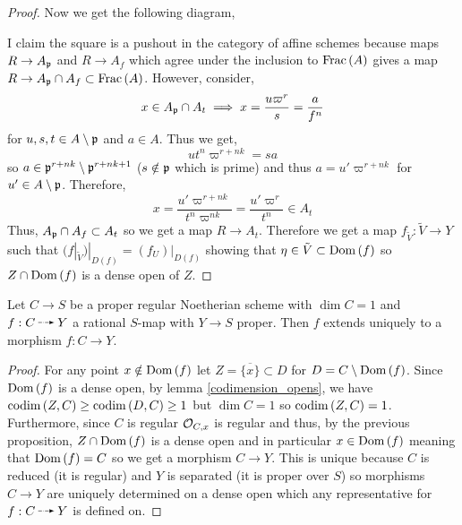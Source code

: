 \documentclass[12pt]{article}
\begin{document}
\begin{proof}
Now we get the following diagram, 
\begin{center}
\end{center}
I claim the square is a pushout in the category of affine schemes because maps $R \to A_{\mathfrak{p}}$ and $R \to A_f$ which agree under the inclusion to $\mathrm{Frac}\left(A\right)$ gives a map $R \to A_{\mathfrak{p}} \cap A_f \subset \mathrm{Frac}\left(A\right)$. However, consider,
\[ x \in A_{\mathfrak{p}} \cap A_t \implies x = \frac{u \varpi^r}{s} = \frac{a}{f^n} \]
for $u, s, t \in A \setminus \mathfrak{p}$ and $a \in A$. Thus we get,
\[ u t^n \varpi^{r + nk} = s a \]
so $a \in \mathfrak{p}^{r + nk} \setminus \mathfrak{p}^{r + nk + 1}$ ($s \notin \mathfrak{p}$ which is prime) and thus $a = u' \varpi^{r + nk}$ for $u' \in A \setminus \mathfrak{p}$. Therefore,
\[ x = \frac{u' \varpi^{r + nk}}{t^n \varpi^{nk}} = \frac{u' \varpi^{r}}{t^n} \in A_t \]
Thus, $A_{\mathfrak{p}} \cap A_f \subset A_t$ so we get a map $R \to A_t$. Therefore we get a map $f_{\tilde{V}} : \tilde{V} \to Y$ such that $(f|_{\tilde{V}})|_{D(f)} = (f_U)|_{D(f)}$ showing that $\eta \in \tilde{V} \subset \mathrm{Dom}\left(f \right)$ so $Z \cap \mathrm{Dom}\left(f \right)$ is a dense open of $Z$. 
\end{proof}

\begin{prop}
Let $C \to S$ be a proper regular Noetherian scheme with $\dim{C} = 1$ and $f : C \rat Y$ a rational $S$-map with $Y \to S$ proper. Then $f$ extends uniquely to a morphism $f : C \to Y$. 
\end{prop}

\begin{proof}
For any point $x \notin \mathrm{Dom}\left(f \right)$ let $Z = \overline{\{ x \}} \subset D$ for $D = C \setminus \mathrm{Dom}\left(f \right)$. Since $\mathrm{Dom}\left(f \right)$ is a dense open, by lemma \ref{codimension_opens}, we have $\mathrm{codim}\left( Z, C \right) \ge \mathrm{codim}\left( D, C \right) \ge 1$ but $\dim{C} = 1$ so $\mathrm{codim}\left( Z, C \right) = 1$. Furthermore, since $C$ is regular $\mathcal{O}_{C, x}$ is regular and thus, by the previous proposition, $Z \cap \mathrm{Dom}\left(f \right)$ is a dense open and in particular $x \in \mathrm{Dom}\left(f \right)$ meaning that $\mathrm{Dom}\left(f \right) = C$ so we get a morphism $C \to Y$. This is unique because $C$ is reduced (it is regular) and $Y$ is separated (it is proper over $S$) so morphisms $C \to Y$ are uniquely determined on a dense open which any representative for $f : C \rat Y$ is defined on.   
\end{proof}
\end{document}
